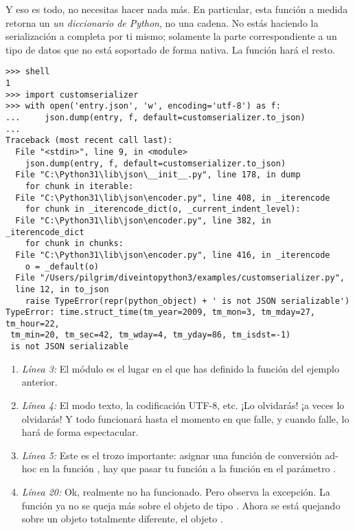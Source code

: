 Y eso es todo, no necesitas hacer nada más. En particular, esta función a medida retorna un \emph{un diccionario de Python}, no una cadena. No estás haciendo la serialización a  completa por ti mismo; solamente la parte correspondiente a un tipo de datos que no está soportado de forma nativa. La función  hará el resto.

\noindent\begin{minipage}{\textwidth}
\begin{lstlisting}[mathescape=True]
>>> shell
1
>>> import customserializer
>>> with open('entry.json', 'w', encoding='utf-8') as f:
...     json.dump(entry, f, default=customserializer.to_json)
... 
Traceback (most recent call last):
  File "<stdin>", line 9, in <module>
    json.dump(entry, f, default=customserializer.to_json)
  File "C:\Python31\lib\json\__init__.py", line 178, in dump
    for chunk in iterable:
  File "C:\Python31\lib\json\encoder.py", line 408, in _iterencode
    for chunk in _iterencode_dict(o, _current_indent_level):
  File "C:\Python31\lib\json\encoder.py", line 382, in _iterencode_dict
    for chunk in chunks:
  File "C:\Python31\lib\json\encoder.py", line 416, in _iterencode
    o = _default(o)
  File "/Users/pilgrim/diveintopython3/examples/customserializer.py", 
  line 12, in to_json
    raise TypeError(repr(python_object) + ' is not JSON serializable')
TypeError: time.struct_time(tm_year=2009, tm_mon=3, tm_mday=27, tm_hour=22,
 tm_min=20, tm_sec=42, tm_wday=4, tm_yday=86, tm_isdst=-1) 
 is not JSON serializable
\end{lstlisting}
\end{minipage}

\begin{enumerate}

\item \emph{Línea 3:} El módulo  es el lugar en el que has definido la función  del ejemplo anterior.

\item \emph{Línea 4:} El modo texto, la codificación UTF-8, etc. ¡Lo olvidarás! ¡a veces lo olvidarás! Y todo funcionará hasta el momento en que falle, y cuando falle, lo hará de forma espectacular.

\item \emph{Línea 5:} Este es el trozo importante: asignar una función de conversión ad-hoc en la función , hay que pasar tu función a la función  en el parámetro .

\item \emph{Línea 20:} Ok, realmente no ha funcionado. Pero observa la excepción. La función  ya no se queja más sobre el objeto de tipo . Ahora se está quejando sobre un objeto totalmente diferente, el objeto .

\end{enumerate}

